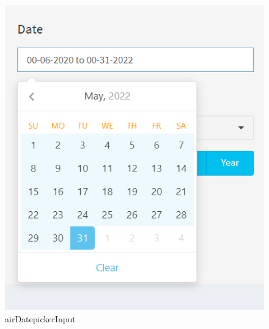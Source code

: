 \documentclass[
  11pt,
]{article}
\begin{document}
\begin{figure}

{\centering \includegraphics{img/page2.png}

}

\caption{airDatepickerInput}

\end{figure}
\end{document}
